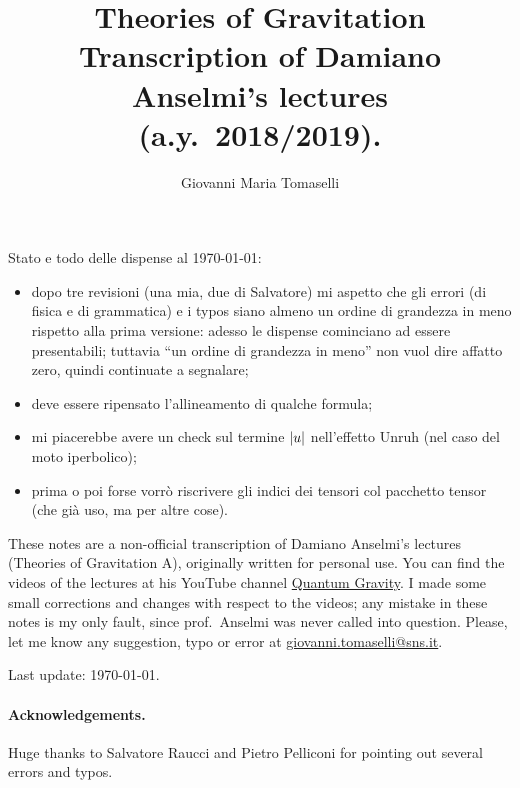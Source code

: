 \documentclass[a4paper,12pt]{book}
\DeclarePairedDelimiter{\abs}{\lvert}{\rvert}
\theoremstyle{definition}
\theoremstyle{remark}
\begin{document}
\author{Giovanni Maria Tomaselli}
\title{Theories of Gravitation\\ \vspace{0.5em} \footnotesize{Transcription of Damiano Anselmi's lectures (a.y.~2018/2019).}}
\date{}
\maketitle

Stato e todo delle dispense al \today:
\begin{itemize}
\item dopo tre revisioni (una mia, due di Salvatore) mi aspetto che gli errori (di fisica e di grammatica) e i typos siano almeno un ordine di grandezza in meno rispetto alla prima versione: adesso le dispense cominciano ad essere presentabili; tuttavia ``un ordine di grandezza in meno'' non vuol dire affatto zero, quindi continuate a segnalare;
\item deve essere ripensato l'allineamento di qualche formula;
\item mi piacerebbe avere un check sul termine $\abs{u}$ nell'effetto Unruh (nel caso del moto iperbolico);
\item prima o poi forse vorrò riscrivere gli indici dei tensori col pacchetto tensor (che già uso, ma per altre cose).
\end{itemize}
\vfill
These notes are a non-official transcription of Damiano Anselmi's lectures (Theories of Gravitation A), originally written for personal use. You can find the videos of the lectures at his YouTube channel \href{https://www.youtube.com/watch?v=VRAMDa6kpqw&list=PLlx_2qxtgAiO_FCa3WvC-39J6c_EpE2wK}{Quantum Gravity}. I made some small corrections and changes with respect to the videos; any mistake in these notes is my only fault, since prof.~Anselmi was never called into question. Please, let me know any suggestion, typo or error at \href{mailto:giovanni.tomaselli@sns.it}{giovanni.tomaselli@sns.it}.

\vspace{1cm}
Last update: \today.
\vspace{1cm}

\paragraph{Acknowledgements.} Huge thanks to Salvatore Raucci and Pietro Pelliconi for pointing out several errors and typos. 

\tableofcontents
\end{document}
